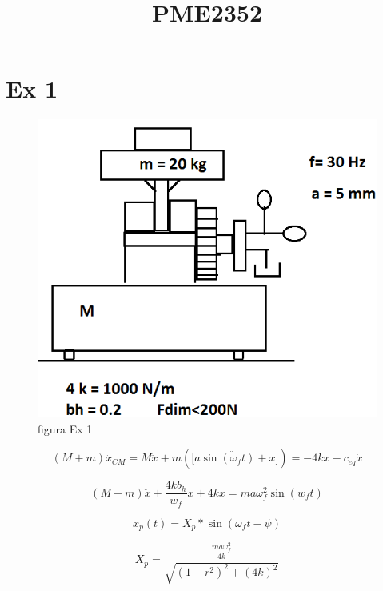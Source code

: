 \documentclass[a4paper, 12pt]{article}
\title{PME2352}
\begin{document}
\maketitle

\section{Ex 1}

\begin{figure}[h]
\begin{center}
\includegraphics[scale=0.48]{./fig/1.png}
\caption{\label{fig:tur}figura Ex 1} 
\end{center}
\end{figure}
  
\[(M+m)\ddot{x}_{CM}=M\ddot{x}+m(\ddot{[a\sin (\omega_{f}t)+x}])=-4kx-c_{eq}\dot{x}\]
 
\[(M+m)\ddot{x}+\frac{4kb_{h}}{w_{f}}\dot{x}+4kx=ma\omega_{f}^{2}\sin(w_{f}t)\]
 
\[x_{p}(t)=X_{p}*\sin(\omega_f t-\psi)\]
 
\[X_{p}=\frac{\frac{ma\omega_{f}^{2}}{4k}}{\sqrt{(1-r^{2})^{2}+(4k)^{2}}}\]
 
\end{document}
